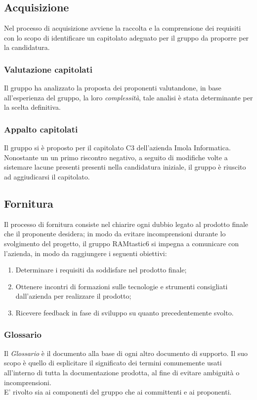 \subsection{Acquisizione}
Nel processo di acquisizione avviene la raccolta e la comprensione dei requisiti con lo scopo di identificare un capitolato adeguato per il gruppo da proporre per la candidatura.
\subsubsection{Valutazione capitolati}
Il gruppo ha analizzato la proposta dei proponenti valutandone, in base all'esperienza del gruppo, la loro \textit{complessità}, tale analisi è stata determinante per la scelta definitiva.
\subsubsection{Appalto capitolati}
Il gruppo si è proposto per il capitolato C3 dell'azienda Imola Informatica. Nonostante un  un primo riscontro negativo, a seguito di modifiche volte a sistemare lacune presenti  presenti nella candidatura iniziale, il gruppo è riuscito ad aggiudicarsi il capitolato.

\subsection{Fornitura}
Il processo di fornitura consiste nel chiarire ogni dubbio legato al prodotto finale che il proponente desidera; in modo da evitare incomprensioni durante lo svolgimento del progetto, il gruppo RAMtastic6 si impegna a comunicare con l'azienda, in modo da raggiungere i seguenti obiettivi:
\begin{enumerate}
    \item Determinare i requisiti da soddisfare nel prodotto finale;
    \item Ottenere incontri di formazioni sulle tecnologie e strumenti consigliati dall'azienda per realizzare il prodotto;
    \item Ricevere feedback in fase di sviluppo su quanto precedentemente svolto.
\end{enumerate}

\subsubsection{Glossario}
Il \textit{Glossario} è il documento alla base di ogni altro documento di supporto. Il suo scopo è quello di esplicitare il significato dei termini comunemente usati all'interno di tutta la documentazione prodotta, al fine di evitare ambiguità o incomprensioni. \\
E' rivolto sia ai componenti del gruppo che ai committenti e ai proponenti. 

